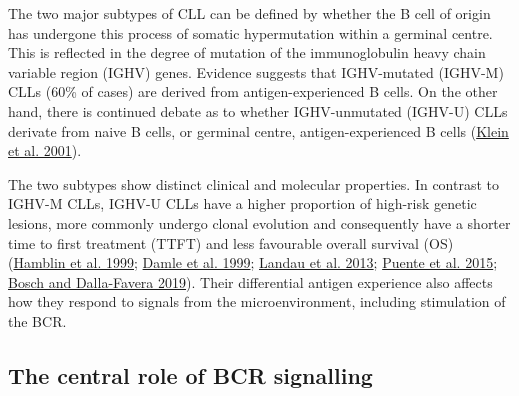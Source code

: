 \documentclass[11pt, a4paper, twosided]{book}
\begin{document}
The two major subtypes of CLL can be defined by whether the B cell of origin has undergone this process of somatic hypermutation within a germinal centre. This is reflected in the degree of mutation of the immunoglobulin heavy chain variable region (IGHV) genes. Evidence suggests that IGHV-mutated (IGHV-M) CLLs (60\% of cases) are derived from antigen-experienced B cells. On the other hand, there is continued debate as to whether IGHV-unmutated (IGHV-U) CLLs derivate from naive B cells, or germinal centre, antigen-experienced B cells (\protect\hyperlink{ref-Klein2001}{Klein et al. 2001}).

The two subtypes show distinct clinical and molecular properties. In contrast to IGHV-M CLLs, IGHV-U CLLs have a higher proportion of high-risk genetic lesions, more commonly undergo clonal evolution and consequently have a shorter time to first treatment (TTFT) and less favourable overall survival (OS) (\protect\hyperlink{ref-Hamblin1999}{Hamblin et al. 1999}; \protect\hyperlink{ref-Damle1999}{Damle et al. 1999}; \protect\hyperlink{ref-Landau2013}{Landau et al. 2013}; \protect\hyperlink{ref-Puente2015}{Puente et al. 2015}; \protect\hyperlink{ref-Bosch2019}{Bosch and Dalla-Favera 2019}). Their differential antigen experience also affects how they respond to signals from the microenvironment, including stimulation of the BCR.

\hypertarget{intro-bcr-signalling}{%
\subsection{The central role of BCR signalling}\label{intro-bcr-signalling}}
\end{document}
